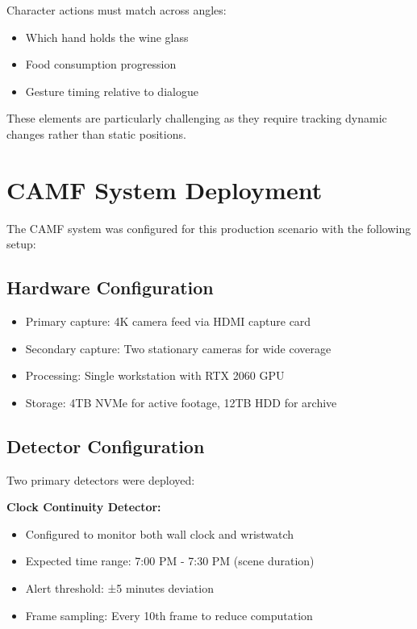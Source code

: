 Character actions must match across angles:
\begin{itemize}
\item Which hand holds the wine glass
\item Food consumption progression
\item Gesture timing relative to dialogue
\end{itemize}

These elements are particularly challenging as they require tracking dynamic changes rather than static positions.

\section{CAMF System Deployment}
\label{sec:camf-application}

The CAMF system was configured for this production scenario with the following setup:

\subsection{Hardware Configuration}
\label{subsec:hardware-config}

\begin{itemize}
\item Primary capture: 4K camera feed via HDMI capture card
\item Secondary capture: Two stationary cameras for wide coverage
\item Processing: Single workstation with RTX 2060 GPU
\item Storage: 4TB NVMe for active footage, 12TB HDD for archive
\end{itemize}

\subsection{Detector Configuration}
\label{subsec:detector-config}

Two primary detectors were deployed:

\textbf{Clock Continuity Detector:}
\begin{itemize}
\item Configured to monitor both wall clock and wristwatch
\item Expected time range: 7:00 PM - 7:30 PM (scene duration)
\item Alert threshold: ±5 minutes deviation
\item Frame sampling: Every 10th frame to reduce computation
\end{itemize}

